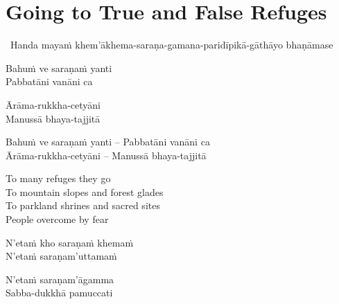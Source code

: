 \suttaRef{[Thag 4.10]}

\ifdigital{}\fi



\section{Going to True and False Refuges}
\label{true-false-refuges}

\begin{leader}
  \anglebracketleft\ \hspace{-0.5mm}Handa mayaṁ khem'ākhema-saraṇa-gamana-paridīpikā-gāthāyo bhaṇāmase \hspace{-0.5mm}\anglebracketright\
\end{leader}

\ifninebythirteen

\begin{pali-hang-verses}
  Bahuṁ ve saraṇaṁ yanti\\
  Pabbatāni vanāni ca
\end{pali-hang-verses}
\begin{pali-hang-together}
  Ārāma-rukkha-cetyāni\\
  Manussā bhaya-tajjitā
\end{pali-hang-together}

\else

\begin{verses}
  Bahuṁ ve saraṇaṁ yanti – Pabbatāni vanāni ca\\
  Ārāma-rukkha-cetyāni – Manussā bhaya-tajjitā
\end{verses}

\fi

\begin{english-verses}
  To many refuges they go\\
  To mountain slopes and forest glades\\
  To parkland shrines and sacred sites\\
  People overcome by fear
\end{english-verses}

\ifninebythirteen

\begin{pali-hang-verses}
  N'etaṁ kho saraṇaṁ khemaṁ\\
  N'etaṁ saraṇam'uttamaṁ\\
\end{pali-hang-verses}
\begin{pali-hang-together}
  N'etaṁ saraṇam'āgamma\\
  Sabba-dukkhā pamuccati
\end{pali-hang-together}

